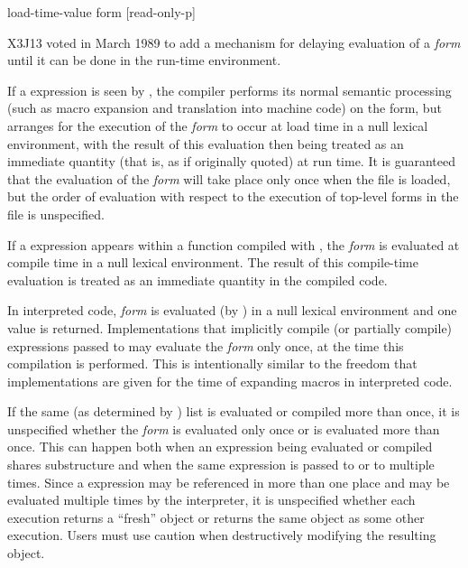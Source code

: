 \begin{newer}
\begin{defspec}
load-time-value form [read-only-p]

X3J13 voted in March 1989  to add
   a mechanism for delaying evaluation of a {\it form}
   until it can be done in the run-time environment.  

   If a  expression is seen by , the compiler
   performs its normal semantic processing (such as macro expansion and
   translation into machine code) on the form, but arranges for the
   execution of the {\it form} to occur at load time in a null
   lexical environment, with the result of this evaluation then being
   treated as an immediate quantity (that is, as if originally quoted)
   at run time.  It is guaranteed that 
   the evaluation of the {\it form} will take place only once when the file is 
   loaded, but the order of evaluation with respect to the execution
   of top-level forms in the file is unspecified.

   If a  expression appears within a function compiled
   with , the {\it form} is evaluated at compile time in a null lexical
   environment.  The result of this compile-time evaluation is treated as 
   an immediate quantity in the compiled code.  

   In interpreted code, {\it form} is evaluated (by ) in a null
   lexical environment and one value is returned.  Implementations that
   implicitly compile (or partially compile) expressions passed to
    may evaluate the {\it form} only once, at the time this
   compilation is performed.  This is intentionally similar to the
   freedom that implementations are given for the time of expanding
   macros in interpreted code.

  If the same (as determined by ) list  is
  evaluated or compiled more than once, it is unspecified whether the {\it form}
  is evaluated only once or is evaluated more than once.  This can
  happen both when an expression being evaluated or compiled shares
  substructure and when the same expression is passed to  or to
   multiple times.  Since a  expression may be
  referenced in more than one place and may be evaluated multiple times
  by the interpreter, it is unspecified whether each execution returns
  a ``fresh'' object or returns the same object as some other execution.
  Users must use caution when destructively modifying the resulting
  object.


\end{defspec}
\end{newer}
